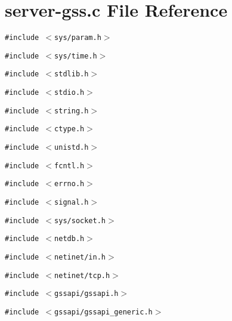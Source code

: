 \section{server-gss.c File Reference}
\label{server-gss_8c}
{\tt \#include $<$sys/param.h$>$}\par
{\tt \#include $<$sys/time.h$>$}\par
{\tt \#include $<$stdlib.h$>$}\par
{\tt \#include $<$stdio.h$>$}\par
{\tt \#include $<$string.h$>$}\par
{\tt \#include $<$ctype.h$>$}\par
{\tt \#include $<$unistd.h$>$}\par
{\tt \#include $<$fcntl.h$>$}\par
{\tt \#include $<$errno.h$>$}\par
{\tt \#include $<$signal.h$>$}\par
{\tt \#include $<$sys/socket.h$>$}\par
{\tt \#include $<$netdb.h$>$}\par
{\tt \#include $<$netinet/in.h$>$}\par
{\tt \#include $<$netinet/tcp.h$>$}\par
{\tt \#include $<$gssapi/gssapi.h$>$}\par
{\tt \#include $<$gssapi/gssapi\_\-generic.h$>$}\par

